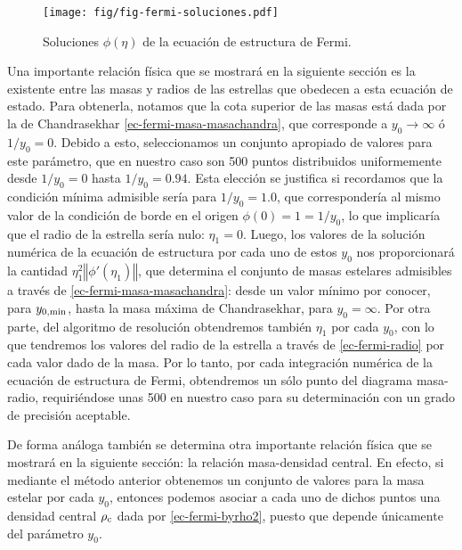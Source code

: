 \begin{figure}[H]
\centering
\texttt{[image: fig/fig-fermi-soluciones.pdf]}
\caption{Soluciones $\phi(\eta)$ de la ecuación de estructura de Fermi.}\label{grafico-fermi-soluciones}
\end{figure}



Una importante relación física que se mostrará en la siguiente sección es la existente entre las masas y radios de las estrellas que obedecen a esta ecuación de estado. Para obtenerla, notamos que la cota superior de las masas está dada por la de Chandrasekhar \eqref{ec-fermi-masa-masachandra}, que corresponde a $y_0\to\infty$ ó $1/y_0=0$. Debido a esto, seleccionamos un conjunto apropiado de valores para este parámetro, que en nuestro caso son 500 puntos distribuidos uniformemente desde $1/y_0=0$ hasta $1/y_0=0.94$. Esta elección se justifica si recordamos que la condición mínima admisible sería para $1/y_0=1.0$, que correspondería al mismo valor de la condición de borde en el origen $\phi(0)=1=1/y_0$, lo que implicaría que el radio de la estrella sería nulo: $\eta_1=0$. Luego, los valores de la solución numérica de la ecuación de estructura por cada uno de estos $y_0$ nos proporcionará la cantidad $\eta_1^2\left\Vert\phi'(\eta_1)\right\Vert$, que determina el conjunto de masas estelares admisibles a través de \eqref{ec-fermi-masa-masachandra}: desde un valor mínimo por conocer, para $y_{\rm 0,min}$, hasta la masa máxima de Chandrasekhar, para $y_0=\infty$. Por otra parte, del algoritmo de resolución obtendremos también $\eta_1$ por cada $y_0$, con lo que tendremos los valores del radio de la estrella a través de \eqref{ec-fermi-radio} por cada valor dado de la masa. Por lo tanto, por cada integración numérica de la ecuación de estructura de Fermi, obtendremos un sólo punto del diagrama masa-radio, requiriéndose unas 500 en nuestro caso para su determinación con un grado de precisión aceptable.

De forma análoga también se determina otra importante relación física que se mostrará en la siguiente sección: la relación masa-densidad central. En efecto, si mediante el método anterior obtenemos un conjunto de valores para la masa estelar por cada $y_0$, entonces podemos asociar a cada uno de dichos puntos una densidad central $\rho_{\rm c}$ dada por \eqref{ec-fermi-byrho2}, puesto que depende únicamente del parámetro $y_0$.


